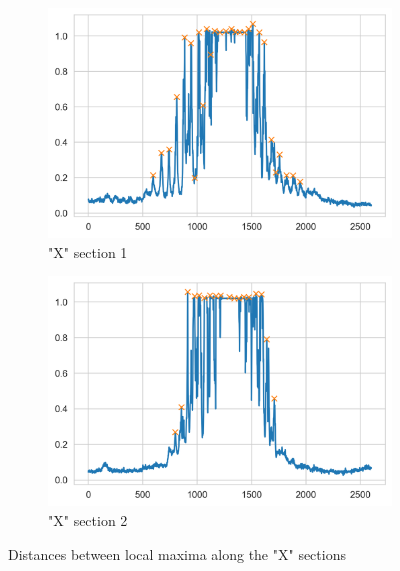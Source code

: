 \begin{figure}[H]
    \centering
    \begin{subfigure}{0.9\columnwidth}
        \centering
        \includegraphics[width=\columnwidth]{figures/X section 1.png} %
        \caption{"X" section 1}
        \label{fig:XSection1}
    \end{subfigure}
    \begin{subfigure}{0.9\columnwidth}
        \centering
        \includegraphics[width=\columnwidth]{figures/X section 2.png}
        \caption{"X" section 2}
        \label{fig:XSection2}
    \end{subfigure}
    \caption{Distances between local maxima along the "X" sections}
    \label{fig:X Sections}
\end{figure}